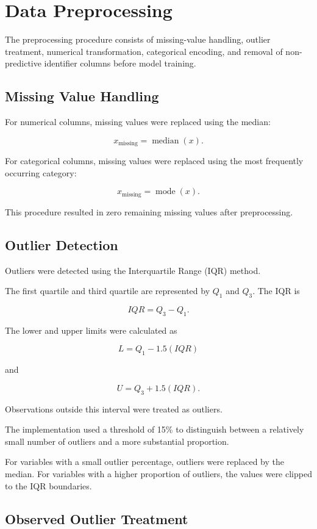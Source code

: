 \documentclass[12pt,a4paper]{article}
\begin{document}
\section{Data Preprocessing}

The preprocessing procedure consists of missing-value handling, outlier
treatment, numerical transformation, categorical encoding, and removal of
non-predictive identifier columns before model training.

\subsection{Missing Value Handling}

For numerical columns, missing values were replaced using the median:

\[
x_{\text{missing}} = \operatorname{median}(x).
\]

For categorical columns, missing values were replaced using the most
frequently occurring category:

\[
x_{\text{missing}} = \operatorname{mode}(x).
\]

This procedure resulted in zero remaining missing values after
preprocessing.

\subsection{Outlier Detection}

Outliers were detected using the Interquartile Range (IQR) method.

The first quartile and third quartile are represented by $Q_1$ and $Q_3$.
The IQR is

\[
IQR = Q_3-Q_1.
\]

The lower and upper limits were calculated as

\[
L = Q_1 - 1.5(IQR)
\]

and

\[
U = Q_3 + 1.5(IQR).
\]

Observations outside this interval were treated as outliers.

The implementation used a threshold of 15\% to distinguish between a
relatively small number of outliers and a more substantial proportion.

For variables with a small outlier percentage, outliers were replaced by
the median. For variables with a higher proportion of outliers, the values
were clipped to the IQR boundaries.

\subsection{Observed Outlier Treatment}
\end{document}
